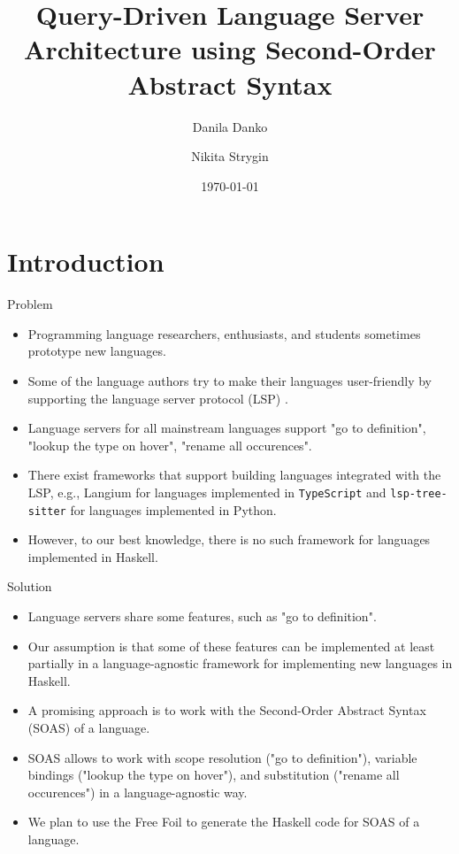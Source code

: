 \documentclass[serif, aspectratio=169]{beamer}
\author[Danko, Strygin]{Danila Danko \inst{1} \and Nikita Strygin \inst{1} \and \newline \newline {Supervisor: Nikolai Kudasov \inst{1}}}
\title{Query-Driven Language Server Architecture using Second-Order Abstract Syntax}
\institute{
    \inst{1}Innopolis University
}
\date{\small \today}
\begin{document}
\begin{frame}
    \titlepage
\end{frame}

\begin{frame}
    \tableofcontents[sectionstyle=show,
        subsectionstyle=show/shaded/hide,
        subsubsectionstyle=show/shaded/hide]
\end{frame}

\section{Introduction}

\begin{frame}{Problem}
    \begin{itemize}
        \item Programming language researchers, enthusiasts, and students sometimes prototype new languages.
        \item Some of the language authors try to make their languages user-friendly by supporting the language server protocol (LSP) \cite{noauthor_language_server_protocol_2024}.
        \item Language servers for all mainstream languages support "go to definition", "lookup the type on hover", "rename all occurences".
        \item There exist frameworks that support building languages integrated with the LSP, e.g., Langium \cite{noauthor_langium_nodate} for languages implemented in \texttt{TypeScript} and \texttt{lsp-tree-sitter} \cite{noauthor_neomuttlsp-tree-sitter_2024} for languages implemented in Python.
        \item However, to our best knowledge, there is no such framework for languages implemented in Haskell.
    \end{itemize}
\end{frame}

\begin{frame}{Solution}
    \begin{itemize}
        \item Language servers share some features, such as "go to definition".
        \item Our assumption is that some of these features can be implemented at least partially in a language-agnostic framework for implementing new languages in Haskell.
        \item A promising approach is to work with the Second-Order Abstract Syntax (SOAS) of a language.
        \item SOAS allows to work with scope resolution ("go to definition"), variable bindings ("lookup the type on hover"), and substitution ("rename all occurences") in a language-agnostic way.
        \item We plan to use the Free Foil \cite{kudasov_free_2024} to generate the Haskell code for SOAS of a language.
    \end{itemize}
\end{frame}
\end{document}
